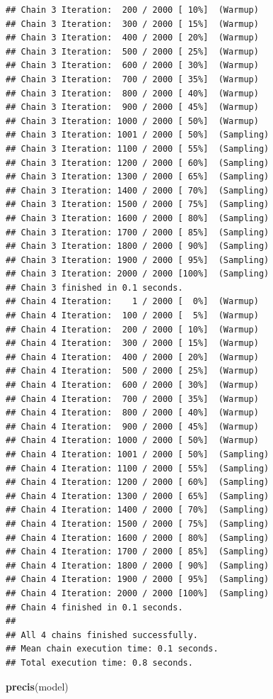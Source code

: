 \documentclass[
]{article}
\newenvironment{Shaded}{\begin{snugshade}}{\end{snugshade}}
\newcommand{\FunctionTok}[1]{\textcolor[rgb]{0.13,0.29,0.53}{\textbf{#1}}}
\newcommand{\NormalTok}[1]{#1}
\begin{document}
\begin{verbatim}
## Chain 3 Iteration:  200 / 2000 [ 10%]  (Warmup) 
## Chain 3 Iteration:  300 / 2000 [ 15%]  (Warmup) 
## Chain 3 Iteration:  400 / 2000 [ 20%]  (Warmup) 
## Chain 3 Iteration:  500 / 2000 [ 25%]  (Warmup) 
## Chain 3 Iteration:  600 / 2000 [ 30%]  (Warmup) 
## Chain 3 Iteration:  700 / 2000 [ 35%]  (Warmup) 
## Chain 3 Iteration:  800 / 2000 [ 40%]  (Warmup) 
## Chain 3 Iteration:  900 / 2000 [ 45%]  (Warmup) 
## Chain 3 Iteration: 1000 / 2000 [ 50%]  (Warmup) 
## Chain 3 Iteration: 1001 / 2000 [ 50%]  (Sampling) 
## Chain 3 Iteration: 1100 / 2000 [ 55%]  (Sampling) 
## Chain 3 Iteration: 1200 / 2000 [ 60%]  (Sampling) 
## Chain 3 Iteration: 1300 / 2000 [ 65%]  (Sampling) 
## Chain 3 Iteration: 1400 / 2000 [ 70%]  (Sampling) 
## Chain 3 Iteration: 1500 / 2000 [ 75%]  (Sampling) 
## Chain 3 Iteration: 1600 / 2000 [ 80%]  (Sampling) 
## Chain 3 Iteration: 1700 / 2000 [ 85%]  (Sampling) 
## Chain 3 Iteration: 1800 / 2000 [ 90%]  (Sampling) 
## Chain 3 Iteration: 1900 / 2000 [ 95%]  (Sampling) 
## Chain 3 Iteration: 2000 / 2000 [100%]  (Sampling) 
## Chain 3 finished in 0.1 seconds.
## Chain 4 Iteration:    1 / 2000 [  0%]  (Warmup) 
## Chain 4 Iteration:  100 / 2000 [  5%]  (Warmup) 
## Chain 4 Iteration:  200 / 2000 [ 10%]  (Warmup) 
## Chain 4 Iteration:  300 / 2000 [ 15%]  (Warmup) 
## Chain 4 Iteration:  400 / 2000 [ 20%]  (Warmup) 
## Chain 4 Iteration:  500 / 2000 [ 25%]  (Warmup) 
## Chain 4 Iteration:  600 / 2000 [ 30%]  (Warmup) 
## Chain 4 Iteration:  700 / 2000 [ 35%]  (Warmup) 
## Chain 4 Iteration:  800 / 2000 [ 40%]  (Warmup) 
## Chain 4 Iteration:  900 / 2000 [ 45%]  (Warmup) 
## Chain 4 Iteration: 1000 / 2000 [ 50%]  (Warmup) 
## Chain 4 Iteration: 1001 / 2000 [ 50%]  (Sampling) 
## Chain 4 Iteration: 1100 / 2000 [ 55%]  (Sampling) 
## Chain 4 Iteration: 1200 / 2000 [ 60%]  (Sampling) 
## Chain 4 Iteration: 1300 / 2000 [ 65%]  (Sampling) 
## Chain 4 Iteration: 1400 / 2000 [ 70%]  (Sampling) 
## Chain 4 Iteration: 1500 / 2000 [ 75%]  (Sampling) 
## Chain 4 Iteration: 1600 / 2000 [ 80%]  (Sampling) 
## Chain 4 Iteration: 1700 / 2000 [ 85%]  (Sampling) 
## Chain 4 Iteration: 1800 / 2000 [ 90%]  (Sampling) 
## Chain 4 Iteration: 1900 / 2000 [ 95%]  (Sampling) 
## Chain 4 Iteration: 2000 / 2000 [100%]  (Sampling) 
## Chain 4 finished in 0.1 seconds.
## 
## All 4 chains finished successfully.
## Mean chain execution time: 0.1 seconds.
## Total execution time: 0.8 seconds.
\end{verbatim}

\begin{Shaded}
\begin{Highlighting}[]
\FunctionTok{precis}\NormalTok{(model)}
\end{Highlighting}
\end{Shaded}
\end{document}
